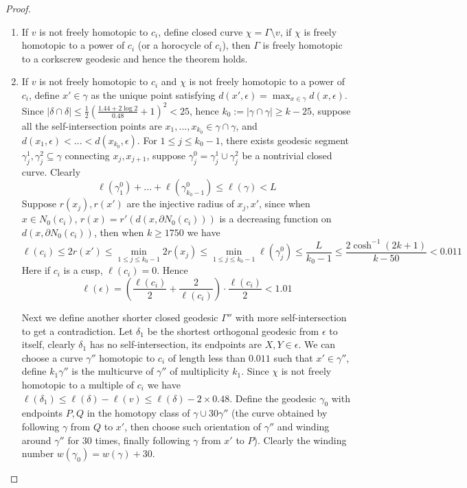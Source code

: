 \documentclass[11pt, a4paper]{article}
\theoremstyle{definition}
\theoremstyle{remark}
\newcommand{\abs}[1]{\left| #1 \right|}
\newcommand{\bracket}[1]{\left( #1 \right)}
\begin{document}
\begin{proof}
\begin{enumerate}
On the other hand, since $\delta|_{[t_1,t_2]}$ is a closed curve which is geodesic except $\delta(t_1)=\delta(t_2)$, and $d_A(\delta(t),\epsilon)$ first decreases and then increases for $t\in[t_1,t_2]$, hence $\frac{d}{dt}d_A(\delta(t),\epsilon)|_{t=t_1}<0$, a contradiction.


\item

If $v$ is not freely homotopic to $c_i$, define closed curve $\chi=\Gamma\setminus v$, if $\chi$ is freely homotopic to a power of $c_i$ (or a horocycle of $c_i$), then $\Gamma$ is freely homotopic to a corkscrew geodesic and hence the theorem holds.

\item
If $v$ is not freely homotopic to $c_i$ and $\chi$ is not freely homotopic to a power of $c_i$, define $x'\in\gamma$ as the unique point satisfying $d(x',\epsilon)=\max_{x\in\gamma}d(x,\epsilon)$. Since $\abs{\delta\cap\delta}\leqslant\frac12\bracket{\frac{1.44+2\log2}{0.48}+1}^2<25$, hence $k_0:=\abs{\gamma\cap\gamma}\geqslant k-25$, suppose all the self-intersection points are $x_1,...,x_{k_0}\in\gamma\cap\gamma$, and $d(x_1,\epsilon)<...<d(x_{k_0},\epsilon)$. For $1\leqslant j\leqslant k_0-1$, there exists geodesic segment $\gamma_j^1,\gamma_j^2\subseteq\gamma$ connecting $x_j,x_{j+1}$, suppose $\gamma_j^0=\gamma_j^1\cup\gamma_j^2$ be a nontrivial closed curve. Clearly 
$$\ell(\gamma_1^0)+...+\ell(\gamma_{k_0-1}^0)\leqslant\ell(\gamma)<L$$
Suppose $r(x_j),r(x')$ are the injective radius of $x_j,x'$, since when $x\in N_0(c_i)$, $r(x)=r'(d(x,\partial N_0(c_i)))$ is a decreasing function on $d(x,\partial N_0(c_i))$, then when $k\geqslant1750$ we have
$$\ell(c_i)\leqslant 2r(x')\leqslant\min_{1\leqslant j\leqslant k_0-1}2r(x_j)\leqslant\min_{1\leqslant j\leqslant k_0-1}\ell(\gamma_j^0)\leqslant\frac{L}{k_0-1}\leqslant\frac{2\cosh^{-1}(2k+1)}{k-50}<0.011$$
Here if $c_i$ is a cusp, $\ell(c_i)=0$. Hence 
$$\ell(\epsilon)=\bracket{\frac{\ell(c_i)}2+\frac2{\ell(c_i)}}\cdot\frac{\ell(c_i)}2<1.01$$

Next we define another shorter closed geodesic $\Gamma''$ with more self-intersection to get a contradiction. Let $\delta_1$ be the shortest orthogonal geodesic from $\epsilon$ to itself, clearly $\delta_1$ has no self-intersection, its endpoints are $X,Y\in\epsilon$. We can choose a curve $\gamma''$ homotopic to $c_i$ of length less than $0.011$ such that $x'\in\gamma''$, define $k_1\gamma''$ is the multicurve of $\gamma''$ of multiplicity $k_1$. Since $\chi$ is not freely homotopic to a multiple of $c_i$ we have $\ell(\delta_1)\leqslant\ell(\delta)-\ell(v)\leqslant\ell(\delta)-2\times0.48$. Define the geodesic $\gamma_0$ with endpoints $P,Q$ in the homotopy class of $\gamma\cup30\gamma''$ (the curve obtained by following $\gamma$ from $Q$ to $x'$, then choose such orientation of $\gamma''$ and winding around $\gamma''$ for 30 times, finally following $\gamma$ from $x'$ to $P$). Clearly the winding number $w(\gamma_0)=w(\gamma)+30$.


\end{enumerate}
\end{proof}
\end{document}
